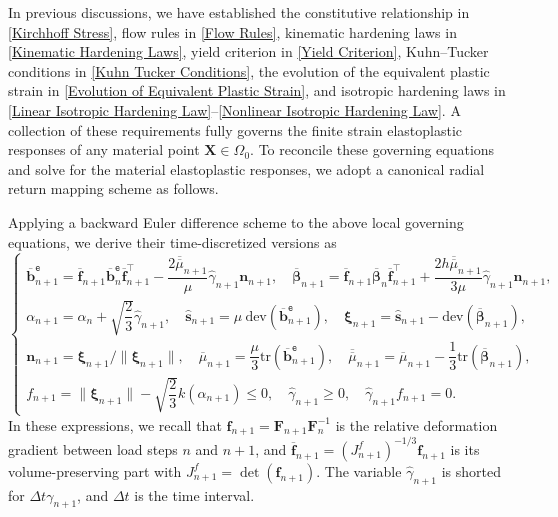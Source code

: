 \documentclass[preprint,11pt]{elsarticle}
\theoremstyle{definition}
\begin{document}
In previous discussions, we have established the constitutive relationship in \eqref{Kirchhoff Stress}, flow rules in \eqref{Flow Rules}, kinematic hardening laws in \eqref{Kinematic Hardening Laws}, yield criterion in \eqref{Yield Criterion}, Kuhn--Tucker conditions in \eqref{Kuhn Tucker Conditions}, the evolution of the equivalent plastic strain in \eqref{Evolution of Equivalent Plastic Strain}, and isotropic hardening laws in \eqref{Linear Isotropic Hardening Law}--\eqref{Nonlinear Isotropic Hardening Law}. A collection of these requirements fully governs the finite strain elastoplastic responses of any material point $\mathbf{X} \in \Omega_0$. To reconcile these governing equations and solve for the material elastoplastic responses, we adopt a canonical radial return mapping scheme \citep{wilkins1969calculation, krieg_accuracies_1977} as follows.

Applying a backward Euler difference scheme to the above local governing equations, we derive their time-discretized versions as
\begin{equation} \label{Local Governing Equations}
    \left\{ \begin{array}{l}
        \overline{\mathbf{b}}_{n+1}^\texttt{e}
        = \overline{\mathbf{f}}_{n+1} \overline{\mathbf{b}}_n^\texttt{e} \overline{\mathbf{f}}_{n+1}^\top
        - \dfrac{2 \overline{\overline{\mu}}_{n+1}}{\mu} \widehat{\gamma}_{n+1} \mathbf{n}_{n+1}, \quad
        \overline{\boldsymbol{\beta}}_{n+1} = \overline{\mathbf{f}}_{n+1} \overline{\boldsymbol{\beta}}_n \overline{\mathbf{f}}_{n+1}^\top
        + \dfrac{2 h \overline{\overline{\mu}}_{n+1}}{3 \mu} \widehat{\gamma}_{n+1} \mathbf{n}_{n+1}, \\[10pt]

        \alpha_{n+1} = \alpha_{n} + \sqrt{\dfrac{2}{3}} \widehat{\gamma}_{n+1}, \quad
        \widehat{\mathbf{s}}_{n+1} = \mu\ \text{dev}(\overline{\mathbf{b}}_{n+1}^\texttt{e}), \quad
        \boldsymbol{\xi}_{n+1} = \widehat{\mathbf{s}}_{n+1} - \text{dev} \left( \overline{\boldsymbol{\beta}}_{n+1} \right),
        \\[10pt]

        \mathbf{n}_{n+1} = \boldsymbol{\xi}_{n+1} / \lVert \boldsymbol{\xi}_{n+1} \rVert, \quad
        \overline{\mu}_{n+1} = \dfrac{\mu}{3} \text{tr}(\overline{\mathbf{b}}_{n+1}^\texttt{e}), \quad
        \overline{\overline{\mu}}_{n+1} = \overline{\mu}_{n+1} - \dfrac{1}{3} \text{tr} (\overline{\boldsymbol{\beta}}_{n+1}), \\[10pt]

        f_{n+1} = \lVert \boldsymbol{\xi}_{n+1} \rVert - \sqrt{\dfrac{2}{3}} k(\alpha_{n+1}) \leq 0, \quad
        \widehat{\gamma}_{n+1} \geq 0, \quad
        \widehat{\gamma}_{n+1} f_{n+1} = 0.
    \end{array} \right.
\end{equation}
In these expressions, we recall that $\mathbf{f}_{n+1} = \mathbf{F}_{n+1} \mathbf{F}_n^{-1}$ is the relative deformation gradient between load steps $n$ and $n+1$, and $\overline{\mathbf{f}}_{n+1} = (J_{n+1}^f)^{-1/3} \mathbf{f}_{n+1}$ is its volume-preserving part with $J_{n+1}^f = \det (\mathbf{f}_{n+1})$. The variable $\widehat{\gamma}_{n+1}$ is shorted for $\Delta t \gamma_{n+1}$, and $\Delta t$ is the time interval.
\end{document}
